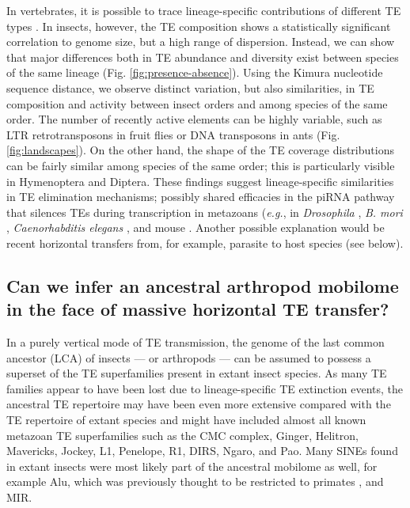 In vertebrates, it is possible to trace lineage-specific contributions
of different TE types \citep{Chalopin2015}. In insects, however, the TE
composition shows a statistically significant correlation to genome
size, but a high range of dispersion. Instead, we can show that major
differences both in TE abundance and diversity exist between species of
the same lineage (Fig. \ref{fig:presence-absence}). Using the Kimura nucleotide sequence
distance, we observe distinct variation, but also similarities, in TE
composition and activity between insect orders and among species of the
same order. The number of recently active elements can be highly
variable, such as LTR retrotransposons in fruit flies or DNA transposons
in ants (Fig. \ref{fig:landscapes}). On the other hand, the shape of the TE coverage
distributions can be fairly similar among species of the same order;
this is particularly visible in Hymenoptera and Diptera. These findings
suggest lineage-specific similarities in TE elimination mechanisms;
possibly shared efficacies in the piRNA pathway that silences TEs during
transcription in metazoans (\emph{e.g.}, in \emph{Drosophila}
\citep{LeThomas2013,Yamashiro2017}, \emph{B. mori} \citep{Matsumoto2016},
\emph{Caenorhabditis elegans} \citep{Zhang2018}, and mouse
\citep{Toth2016}. Another possible explanation would be recent
horizontal transfers from, for example, parasite to host species (see
below).

\subsection{Can we infer an ancestral arthropod mobilome in the face of
massive horizontal TE
transfer?}

In a purely vertical mode of TE transmission, the genome of the last
common ancestor (LCA) of insects --- or arthropods --- can be assumed to
possess a superset of the TE superfamilies present in extant insect
species. As many TE families appear to have been lost due to
lineage-specific TE extinction events, the ancestral TE repertoire may
have been even more extensive compared with the TE repertoire of extant
species and might have included almost all known metazoan TE
superfamilies such as the CMC complex, Ginger, Helitron, Mavericks,
Jockey, L1, Penelope, R1, DIRS, Ngaro, and Pao. Many SINEs found in
extant insects were most likely part of the ancestral mobilome as well,
for example Alu, which was previously thought to be restricted to
primates \citep{Deininger2011}, and MIR.

